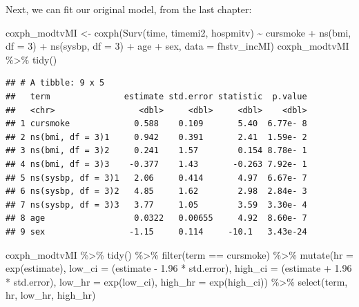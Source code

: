 \documentclass[
]{book}
\newenvironment{Shaded}{\begin{snugshade}}{\end{snugshade}}
\newcommand{\AttributeTok}[1]{\textcolor[rgb]{0.77,0.63,0.00}{#1}}
\newcommand{\DecValTok}[1]{\textcolor[rgb]{0.00,0.00,0.81}{#1}}
\newcommand{\FloatTok}[1]{\textcolor[rgb]{0.00,0.00,0.81}{#1}}
\newcommand{\FunctionTok}[1]{\textcolor[rgb]{0.00,0.00,0.00}{#1}}
\newcommand{\NormalTok}[1]{#1}
\newcommand{\OtherTok}[1]{\textcolor[rgb]{0.56,0.35,0.01}{#1}}
\newcommand{\SpecialCharTok}[1]{\textcolor[rgb]{0.00,0.00,0.00}{#1}}
\newcommand{\StringTok}[1]{\textcolor[rgb]{0.31,0.60,0.02}{#1}}
\begin{document}
Next, we can fit our original model, from the last chapter:

\begin{Shaded}
\begin{Highlighting}[]
\NormalTok{coxph\_modtvMI }\OtherTok{\textless{}{-}} \FunctionTok{coxph}\NormalTok{(}\FunctionTok{Surv}\NormalTok{(time, timemi2, hospmitv) }\SpecialCharTok{\textasciitilde{}} 
\NormalTok{                         cursmoke }\SpecialCharTok{+} \FunctionTok{ns}\NormalTok{(bmi, }\AttributeTok{df =} \DecValTok{3}\NormalTok{) }\SpecialCharTok{+} 
                         \FunctionTok{ns}\NormalTok{(sysbp, }\AttributeTok{df =} \DecValTok{3}\NormalTok{) }\SpecialCharTok{+}\NormalTok{ age }\SpecialCharTok{+}\NormalTok{ sex, }
                              \AttributeTok{data =}\NormalTok{ fhstv\_incMI)}
\NormalTok{coxph\_modtvMI }\SpecialCharTok{\%\textgreater{}\%}
  \FunctionTok{tidy}\NormalTok{()}
\end{Highlighting}
\end{Shaded}

\begin{verbatim}
## # A tibble: 9 x 5
##   term               estimate std.error statistic  p.value
##   <chr>                 <dbl>     <dbl>     <dbl>    <dbl>
## 1 cursmoke             0.588    0.109       5.40  6.77e- 8
## 2 ns(bmi, df = 3)1     0.942    0.391       2.41  1.59e- 2
## 3 ns(bmi, df = 3)2     0.241    1.57        0.154 8.78e- 1
## 4 ns(bmi, df = 3)3    -0.377    1.43       -0.263 7.92e- 1
## 5 ns(sysbp, df = 3)1   2.06     0.414       4.97  6.67e- 7
## 6 ns(sysbp, df = 3)2   4.85     1.62        2.98  2.84e- 3
## 7 ns(sysbp, df = 3)3   3.77     1.05        3.59  3.30e- 4
## 8 age                  0.0322   0.00655     4.92  8.60e- 7
## 9 sex                 -1.15     0.114     -10.1   3.43e-24
\end{verbatim}

\begin{Shaded}
\begin{Highlighting}[]
\NormalTok{coxph\_modtvMI }\SpecialCharTok{\%\textgreater{}\%} 
  \FunctionTok{tidy}\NormalTok{() }\SpecialCharTok{\%\textgreater{}\%} 
  \FunctionTok{filter}\NormalTok{(term }\SpecialCharTok{==} \StringTok{\textquotesingle{}cursmoke\textquotesingle{}}\NormalTok{) }\SpecialCharTok{\%\textgreater{}\%}
  \FunctionTok{mutate}\NormalTok{(}\AttributeTok{hr =} \FunctionTok{exp}\NormalTok{(estimate),}
         \AttributeTok{low\_ci =}\NormalTok{ (estimate }\SpecialCharTok{{-}} \FloatTok{1.96} \SpecialCharTok{*}\NormalTok{ std.error), }
         \AttributeTok{high\_ci =}\NormalTok{ (estimate }\SpecialCharTok{+} \FloatTok{1.96} \SpecialCharTok{*}\NormalTok{ std.error), }
         \AttributeTok{low\_hr =} \FunctionTok{exp}\NormalTok{(low\_ci), }
         \AttributeTok{high\_hr =} \FunctionTok{exp}\NormalTok{(high\_ci)) }\SpecialCharTok{\%\textgreater{}\%} 
  \FunctionTok{select}\NormalTok{(term, hr, low\_hr, high\_hr)}
\end{Highlighting}
\end{Shaded}
\end{document}

